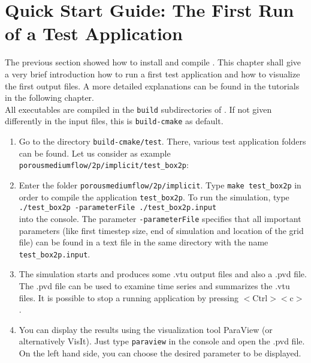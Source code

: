 \section[Quick Start Guide]{Quick Start Guide: The First Run of a Test Application}
\label{quick-start-guide}

The previous section showed how to install and compile \Dumux. This chapter
shall give a very brief introduction how to run a first test application and how
to visualize the first output files. A more detailed explanations can be found in
the tutorials in the following chapter.\\
All executables are compiled in the \texttt{build} subdirectories of \Dumux.
If not given differently in the input files, this is \texttt{build-cmake} as default.

\begin{enumerate}
\item Go to the directory \texttt{build-cmake/test}. There, various test application
      folders can be found. Let us consider as example \texttt{porousmediumflow/2p/implicit/test{\_}box2p}:
\item Enter the folder \texttt{porousmediumflow/2p/implicit}. Type \texttt{make test{\_}box2p} in order
      to compile the application \texttt{test{\_}box2p}. To run the simulation, type\\
      \texttt{./test{\_}box2p -parameterFile ./test\_box2p.input}\\
      into the console. The parameter \texttt{-parameterFile} specifies that all
      important parameters (like first timestep size, end of simulation and location
      of the grid file) can be found in a text file in the same directory  with the
      name \texttt{test\_box2p.input}.
\item The simulation starts and produces some .vtu output files and also a .pvd
      file. The .pvd file can be used to examine time series and summarizes the .vtu
      files. It is possible to stop a running application by pressing $<$Ctrl$><$c$>$.
\item You can display the results using the visualization tool ParaView (or
      alternatively VisIt). Just type \texttt{paraview} in the console and open the
      .pvd file. On the left hand side, you can choose the desired parameter to be displayed.
\end{enumerate}

